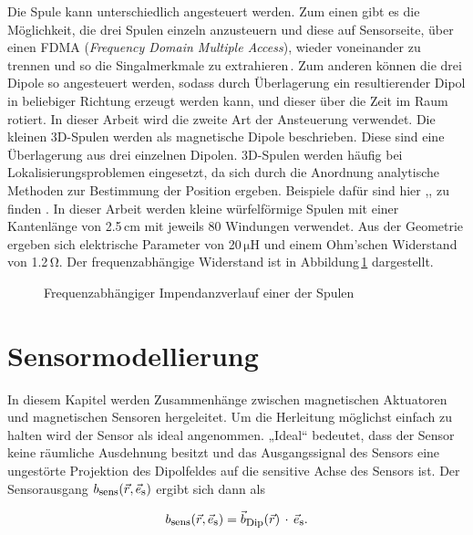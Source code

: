 Die Spule kann unterschiedlich angesteuert werden. Zum einen gibt es die Möglichkeit, die drei Spulen einzeln anzusteuern und diese auf Sensorseite, über einen FDMA (\textit{Frequency Domain Multiple Access}), wieder voneinander zu trennen und so die Singalmerkmale zu extrahieren\,\cite{hoffmann_concept_2022}. Zum anderen können die drei Dipole so angesteuert werden, sodass durch Überlagerung ein resultierender Dipol in beliebiger Richtung erzeugt werden kann, und dieser über die Zeit im Raum rotiert. In dieser Arbeit wird die zweite Art der Ansteuerung verwendet. Die kleinen 3D-Spulen werden als magnetische Dipole beschrieben. Diese sind eine Überlagerung aus drei einzelnen Dipolen. 3D-Spulen werden häufig bei Lokalisierungsproblemen eingesetzt, da sich durch die Anordnung analytische Methoden zur Bestimmung der Position ergeben. Beispiele dafür sind hier \cite{raab_magnetic_1979},\cite{paperno_new_2001},\cite{paperno_three-dimensional_2004} zu finden . In dieser Arbeit werden kleine würfelförmige Spulen mit einer Kantenlänge von 2.5\,cm mit jeweils 80 Windungen verwendet. Aus der Geometrie ergeben sich elektrische Parameter von 20\,$\mathrm{\mu H}$ und einem Ohm'schen Widerstand von 1.2\,$\mathrm{\Omega}$. Der frequenzabhängige Widerstand ist in Abbildung\,\ref{fig:FreqSpule} dargestellt.
 
\begin{figure}[h]
    \centering
    \caption{Frequenzabhängiger Impendanzverlauf einer der Spulen}
    \label{fig:FreqSpule}
\end{figure}

\section{Sensormodellierung}
\label{sec:Sensor_model}
In diesem Kapitel werden Zusammenhänge zwischen magnetischen Aktuatoren und magnetischen Sensoren hergeleitet. Um die Herleitung möglichst einfach zu halten wird der Sensor als ideal angenommen. „Ideal“ bedeutet, dass der Sensor keine räumliche Ausdehnung besitzt und das Ausgangssignal des Sensors eine ungestörte Projektion des Dipolfeldes auf die sensitive Achse des Sensors ist. Der Sensorausgang $b_{\textrm{\footnotesize{sens}}}(\vec{r},\vec{e}_{\textrm{\footnotesize{s}}})$ ergibt sich dann als

\begin{equation}
    b_{\textrm{\footnotesize{sens}}}(\vec{r},\vec{e}_{\textrm{\footnotesize{s}}}) =  \vec{b}_{\textrm{\footnotesize{Dip}}}(\vec{r})\,\cdot \, \vec{e}_{\textrm{\footnotesize{s}}}.
    \label{eq:Sensorprojektion}
 \end{equation}

